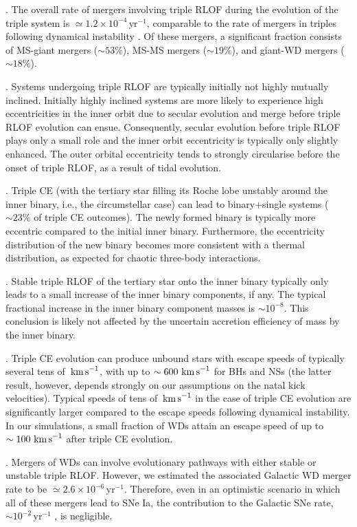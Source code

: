 \documentclass[twocolumn,appendixfloats,tighten]{aastex631}
\newcommand{\kms}{\, {\rm km\, s}^{-1}}
\newcommand{\yr}{\mathrm{yr}}
\begin{document}
\medskip {}. The overall rate of mergers involving triple RLOF during the evolution of the triple system is $\simeq 1.2 \times 10^{-4}\,\yr^{-1}$, comparable to the rate of mergers in triples following dynamical instability \citep{2012ApJ...760...99P,2021arXiv210713620H,2021arXiv210804272T}. Of these mergers, a significant fraction consists of MS-giant mergers ($\sim 53\%$), MS-MS mergers ($\sim 19\%$), and giant-WD mergers ($\sim 18\%$). 

\medskip {}. Systems undergoing triple RLOF are typically initially not highly mutually inclined. Initially highly inclined systems are more likely to experience high eccentricities in the inner orbit due to secular evolution and merge before triple RLOF evolution can ensue. Consequently, secular evolution before triple RLOF plays only a small role and the inner orbit eccentricity is typically only slightly enhanced. The outer orbital eccentricity tends to strongly circularise before the onset of triple RLOF, as a result of tidal evolution. 

\medskip {}. Triple CE (with the tertiary star filling its Roche lobe unstably around the inner binary, i.e., the circumstellar case) can lead to binary+single systems ($\sim 23\%$ of triple CE outcomes). The newly formed binary is typically more eccentric compared to the initial inner binary. Furthermore, the eccentricity distribution of the new binary becomes more consistent with a thermal distribution, as expected for chaotic three-body interactions. 

\medskip {}. Stable triple RLOF of the tertiary star onto the inner binary typically only leads to a small increase of the inner binary components, if any. The typical fractional increase in the inner binary component masses is $\sim 10^{-8}$. This conclusion is likely not affected by the uncertain accretion efficiency of mass by the inner binary. 

\medskip {}. Triple CE evolution can produce unbound stars with escape speeds of typically several tens of $\kms$, with up to $\sim 600\,\kms$ for BHs and NSs (the latter result, however, depends strongly on our assumptions on the natal kick velocities). Typical speeds of tens of $\kms$ in the case of triple CE evolution are significantly larger compared to the escape speeds following dynamical instability. In our simulations, a small fraction of WDs attain an escape speed of up to $\sim 100\,\kms$ after triple CE evolution. 
 
\medskip {}. Mergers of WDs can involve evolutionary pathways with either stable or unstable triple RLOF. However, we estimated the associated Galactic WD merger rate to be $\simeq 2.6 \times 10^{-6} \, \yr^{-1}$. Therefore, even in an optimistic scenario in which all of these mergers lead to SNe Ia, the contribution to the Galactic SNe rate, $\sim 10^{-2}\,\yr^{-1}$ \citep{2013ApJ...778..164A}, is negligible. 
\end{document}
